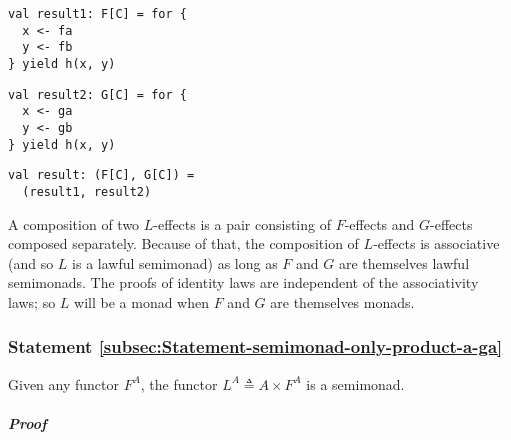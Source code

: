 \begin{center}
\begin{minipage}[t]{0.3\columnwidth}%
\begin{lstlisting}
val result1: F[C] = for {
  x <- fa
  y <- fb
} yield h(x, y)
\end{lstlisting}
%
\end{minipage}\hfill{} %
\begin{minipage}[t]{0.3\columnwidth}%
\begin{lstlisting}
val result2: G[C] = for {
  x <- ga
  y <- gb
} yield h(x, y)
\end{lstlisting}
%
\end{minipage}\hfill{} %
\begin{minipage}[t]{0.3\columnwidth}%
\begin{lstlisting}
val result: (F[C], G[C]) =
  (result1, result2)
\end{lstlisting}
%
\end{minipage}\vspace{-0.35\baselineskip}
\par\end{center}

A composition of two $L$-effects is a pair consisting of $F$-effects
and $G$-effects composed separately. Because of that, the composition
of $L$-effects is associative (and so $L$ is a lawful semimonad)
as long as $F$ and $G$ are themselves lawful semimonads. The proofs
of identity laws are independent of the associativity laws; so $L$
will be a monad when $F$ and $G$ are themselves monads.

\subsubsection{Statement \label{subsec:Statement-semimonad-only-product-a-ga}\ref{subsec:Statement-semimonad-only-product-a-ga}}

Given any functor $F^{A}$, the functor $L^{A}\triangleq A\times F^{A}$
is a semimonad.

\subparagraph{Proof}

